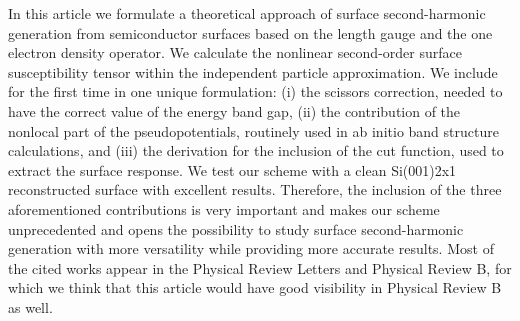 In this article we formulate a theoretical approach of surface
second-harmonic generation from semiconductor surfaces based on the
length gauge and the one electron density operator.  We calculate the
nonlinear second-order surface susceptibility tensor within the
independent particle approximation. We include for the first time in one
unique formulation: (i) the scissors correction, needed to have the
correct value of the energy band gap, (ii) the contribution of the
nonlocal part of the pseudopotentials, routinely used in ab initio
band structure calculations, and (iii) the derivation for the
inclusion of the cut function, used to extract the surface response.
We test our scheme with a clean Si(001)2x1 reconstructed surface with
excellent results.  Therefore, the inclusion of the three
aforementioned contributions is very important and makes our scheme
unprecedented and opens the possibility to study surface
second-harmonic generation with more versatility while providing more
accurate results.  Most of the cited works appear in the Physical
Review Letters and Physical Review B, for which we think that this
article would have good visibility in Physical Review B as well.

